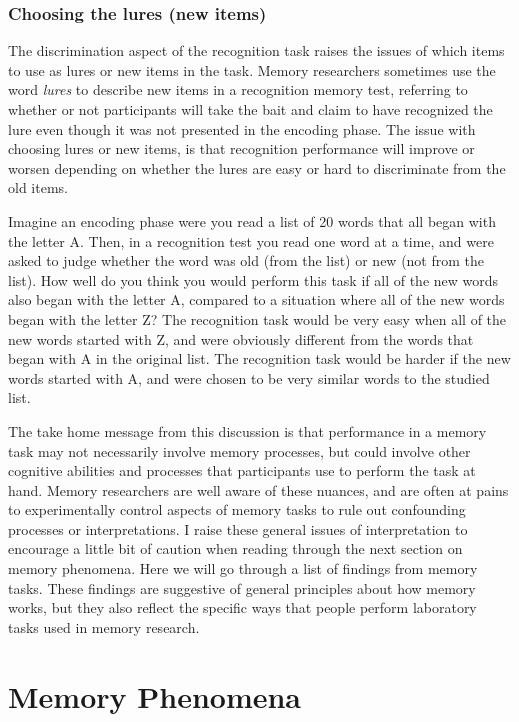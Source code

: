 \documentclass[
  oneside,
  12pt]{crumpbook}
\begin{document}
\hypertarget{choosing-the-lures-new-items}{%
\subsubsection{Choosing the lures (new items)}\label{choosing-the-lures-new-items}}

The discrimination aspect of the recognition task raises the issues of which items to use as lures or new items in the task. Memory researchers sometimes use the word \emph{lures} to describe new items in a recognition memory test, referring to whether or not participants will take the bait and claim to have recognized the lure even though it was not presented in the encoding phase. The issue with choosing lures or new items, is that recognition performance will improve or worsen depending on whether the lures are easy or hard to discriminate from the old items.

Imagine an encoding phase were you read a list of 20 words that all began with the letter A. Then, in a recognition test you read one word at a time, and were asked to judge whether the word was old (from the list) or new (not from the list). How well do you think you would perform this task if all of the new words also began with the letter A, compared to a situation where all of the new words began with the letter Z? The recognition task would be very easy when all of the new words started with Z, and were obviously different from the words that began with A in the original list. The recognition task would be harder if the new words started with A, and were chosen to be very similar words to the studied list.

The take home message from this discussion is that performance in a memory task may not necessarily involve memory processes, but could involve other cognitive abilities and processes that participants use to perform the task at hand. Memory researchers are well aware of these nuances, and are often at pains to experimentally control aspects of memory tasks to rule out confounding processes or interpretations. I raise these general issues of interpretation to encourage a little bit of caution when reading through the next section on memory phenomena. Here we will go through a list of findings from memory tasks. These findings are suggestive of general principles about how memory works, but they also reflect the specific ways that people perform laboratory tasks used in memory research.

\hypertarget{memory-phenomena}{%
\section{Memory Phenomena}\label{memory-phenomena}}
\end{document}
